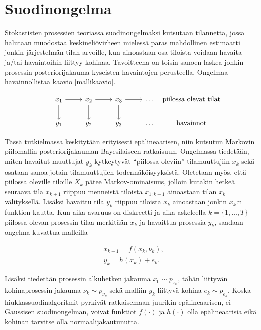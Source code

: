 \documentclass[
  12pt,
  a4paper, twoside]{book}
\begin{document}
\section{Suodinongelma}

Stokastisten prosessien teoriassa suodinongelmaksi kutsutaan tilannetta, jossa halutaan muodostaa keskineliövirheen mielessä paras mahdollinen estimaatti jonkin järjestelmän tilan arvoille, kun ainoastaan osa tiloista voidaan havaita ja/tai havaintoihin liittyy kohinaa. Tavoitteena on toisin sanoen laskea jonkin prosessin posteriorijakauma kyseisten havaintojen perusteella. Ongelmaa havainnollistaa kaavio \ref{mallikaavio}.

\begin{equation}\label{mallikaavio}
\begin{tikzcd}
x_1 \arrow[d] \arrow[r] & x_2 \arrow[d] \arrow[r] & x_3 \arrow[d] \arrow[r] & \ldots & \makebox[\widthof{$ \text{havainnot}$}]{$\text{piilossa olevat tilat}$} \\
y_1  & y_2  & y_3  & \ldots & \makebox[\widthof{$ \text{havainnot}$}]{$\text{havainnot}$}
\end{tikzcd}
\end{equation}

Tässä tutkielmassa keskitytään erityisesti epälineaarisen, niin kutsutun Markovin piilomallin posteriorijakauman Bayesilaiseen ratkaisuun. Ongelmassa tiedetään, miten havaitut muuttujat \(y_k\) kytkeytyvät ``piilossa oleviin'' tilamuuttujiin \(x_k\) sekä osataan sanoa jotain tilamuuttujien todennäköisyyksistä. Oletetaan myös, että piilossa oleville tiloille \(X_k\) pätee Markov-ominaisuus, jolloin kutakin hetkeä seuraava tila \(x_{k+1}\) riippuu menneistä tiloista \(x_{1:k-1}\) ainoastaan tilan \(x_k\) välityksellä. Lisäksi havaittu tila \(y_k\) riippuu tiloista \(x_{k}\) ainoastaan jonkin \(x_k\):n funktion kautta. Kun aika-avaruus on diskreetti ja aika-askeleella \(k=\{1,\ldots,T\}\) piilossa olevan prosessin tilaa merkitään \(x_k\) ja havaittua prosessia \(y_k\), saadaan ongelma kuvattua malleilla

\begin{align}
&\label{malli-1} x_{k+1} = f(x_k, \nu_k),\\
&\label{malli-2} y_{k} = h(x_k)+e_k.
\end{align}

Lisäksi tiedetään prosessin alkuhetken jakauma \(x_0 \sim p_{x_{0}}\), tähän liittyvän kohinaprosessin jakauma \(\nu_k \sim p_{\nu_{k}}\) sekä malliin \(y_k\) liittyvä kohina \(e_k \sim p_{e_k}\). Koska hiukkassuodinalgoritmit pyrkivät ratkaisemaan juurikin epälineaarisen, ei-Gaussisen suodinongelman, voivat funktiot \(f(\cdot)\) ja \(h(\cdot)\) olla epälineaarisia eikä kohinan tarvitse olla normaalijakautunutta.
\end{document}
